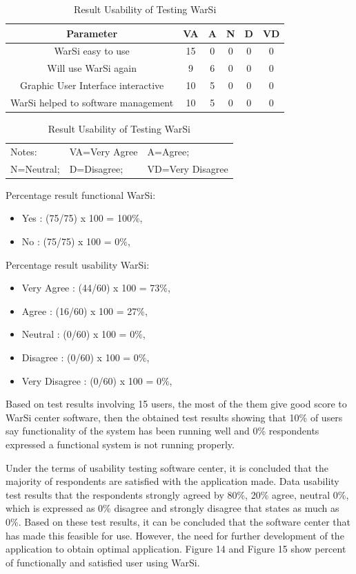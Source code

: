 \documentclass[conference, letterpaper]{IEEEtran}
\begin{document}
\begin{table}[!t]
\renewcommand{\arraystretch}{1.3}
\caption{Result Usability of Testing WarSi}
\label{table_usability}
\centering
\begin{tabular}{|c|c|c|c|c|c|}
\hline
\textbf{Parameter} & \textbf{VA} & \textbf{A} & \textbf{N} & \textbf{D} & \textbf{VD}\\
\hline
WarSi easy to use & 15 & 0 & 0 & 0 & 0\\
\hline
Will use WarSi again & 9 & 6 & 0 & 0 & 0\\
\hline
Graphic User Interface interactive & 10 & 5 & 0 & 0 & 0\\
\hline
WarSi helped to software management & 10 & 5 & 0 & 0 & 0\\
\hline
\end{tabular}
\begin{tabular}{lll}
Notes: &VA=Very Agree& A=Agree;\\
N=Neutral; &D=Disagree; &VD=Very Disagree\\
\end{tabular}
\end{table}

Percentage result functional WarSi:
\begin{itemize}
\item Yes : (75/75) x 100 = 100\%,
\item No : (75/75) x 100 = 0\%,
\end{itemize}

Percentage result usability WarSi:
\begin{itemize}
\item Very Agree : (44/60) x 100 = 73\%,
\item Agree : (16/60) x 100 = 27\%,
\item Neutral : (0/60) x 100 = 0\%,
\item Disagree : (0/60) x 100 = 0\%,
\item Very Disagree : (0/60) x 100 = 0\%,
\end{itemize}

Based on test results involving 15 users, the most of the them give good score to WarSi center software, then the obtained test results showing that 10\% of users say functionality of the system has been running well and 0\% respondents expressed a functional system is not running properly. 

Under the terms of usability testing software center, it is concluded that the majority of respondents are satisfied with the application made. Data usability test results that the respondents strongly agreed by 80\%, 20\% agree, neutral 0\%, which is expressed as 0\% disagree and strongly disagree that states as much as 0\%. Based on these test results, it can be concluded that the software center that has made this feasible for use. However, the need for further development of the application to obtain optimal application. Figure 14 and Figure 15 show percent of functionally and satisfied user using WarSi.
\end{document}

